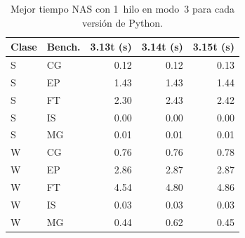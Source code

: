 \begin{table}[htbp]
\centering
\small
\begin{tabular}{llrrr}
\hline
Clase & Bench. & 3.13t (s) & 3.14t (s) & 3.15t (s) \\
\hline
S & CG & 0.12 & 0.12 & 0.13 \\
S & EP & 1.43 & 1.43 & 1.44 \\
S & FT & 2.30 & 2.43 & 2.42 \\
S & IS & 0.00 & 0.00 & 0.00 \\
S & MG & 0.01 & 0.01 & 0.01 \\
W & CG & 0.76 & 0.76 & 0.78 \\
W & EP & 2.86 & 2.87 & 2.87 \\
W & FT & 4.54 & 4.80 & 4.86 \\
W & IS & 0.03 & 0.03 & 0.03 \\
W & MG & 0.44 & 0.62 & 0.45 \\
\hline
\end{tabular}
\caption{Mejor tiempo NAS con 1~hilo en modo~3 para cada versión de Python.}
\label{tab:versiones-t1-mode3}
\end{table}
